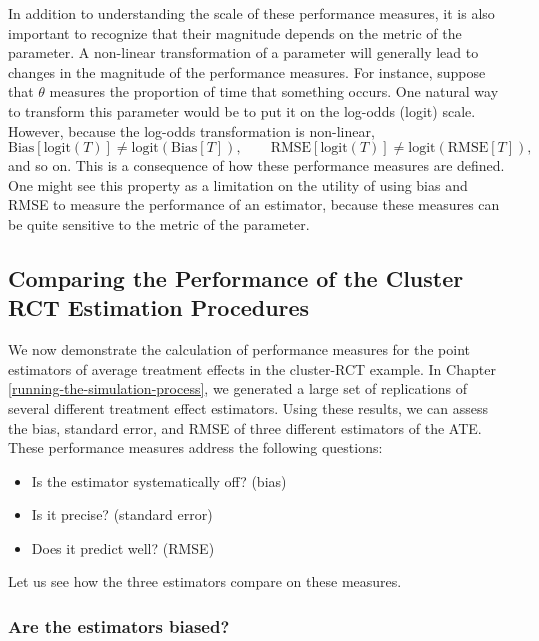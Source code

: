 \documentclass[
]{book}
\providecommand{\tightlist}{%
  \setlength{\itemsep}{0pt}\setlength{\parskip}{0pt}}
\begin{document}
In addition to understanding the scale of these performance measures, it is also important to recognize that their magnitude depends on the metric of the parameter.
A non-linear transformation of a parameter will generally lead to changes in the magnitude of the performance measures.
For instance, suppose that \(\theta\) measures the proportion of time that something occurs.
One natural way to transform this parameter would be to put it on the log-odds (logit) scale.
However, because the log-odds transformation is non-linear,
\[
\text{Bias}\left[\text{logit}(T)\right] \neq \text{logit}\left(\text{Bias}[T]\right), \qquad \text{RMSE}\left[\text{logit}(T)\right] \neq \text{logit}\left(\text{RMSE}[T]\right),
\]
and so on.
This is a consequence of how these performance measures are defined.
One might see this property as a limitation on the utility of using bias and RMSE to measure the performance of an estimator, because these measures can be quite sensitive to the metric of the parameter.

\subsection{Comparing the Performance of the Cluster RCT Estimation Procedures}\label{clusterRCTperformance}

We now demonstrate the calculation of performance measures for the point estimators of average treatment effects in the cluster-RCT example.
In Chapter \ref{running-the-simulation-process}, we generated a large set of replications of several different treatment effect estimators.
Using these results, we can assess the bias, standard error, and RMSE of three different estimators of the ATE.
These performance measures address the following questions:

\begin{itemize}
\tightlist
\item
  Is the estimator systematically off? (bias)
\item
  Is it precise? (standard error)
\item
  Does it predict well? (RMSE)
\end{itemize}

Let us see how the three estimators compare on these measures.

\subsubsection*{Are the estimators biased?}\label{are-the-estimators-biased}
\end{document}
